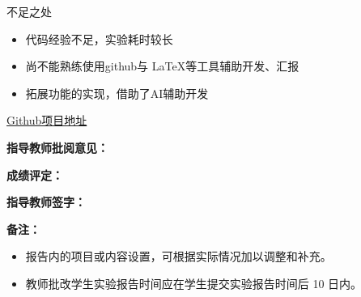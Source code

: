 \documentclass[a4paper,12pt]{article}
\begin{document}
不足之处

\begin{itemize}
    \item 代码经验不足，实验耗时较长
    \item 尚不能熟练使用github与 \LaTeX 等工具辅助开发、汇报
    \item 拓展功能的实现，借助了AI辅助开发
\end{itemize}

\href {https://github.com/coool-day/Python-project} {Github项目地址}

\newpage



\vspace{1cm}

\noindent \textbf{指导教师批阅意见：}
\vspace{5cm}
\hfill

\vspace{1cm}

\noindent \textbf{成绩评定：}
\vspace{2cm}
\hfill

\vspace{1cm}

\noindent \textbf{指导教师签字：}
\vspace{2cm}
\hfill

\vspace{1cm}

\noindent \textbf{备注：}
\begin{itemize}
    \item 报告内的项目或内容设置，可根据实际情况加以调整和补充。
    \item 教师批改学生实验报告时间应在学生提交实验报告时间后 10 日内。
\end{itemize}

\end{document}
